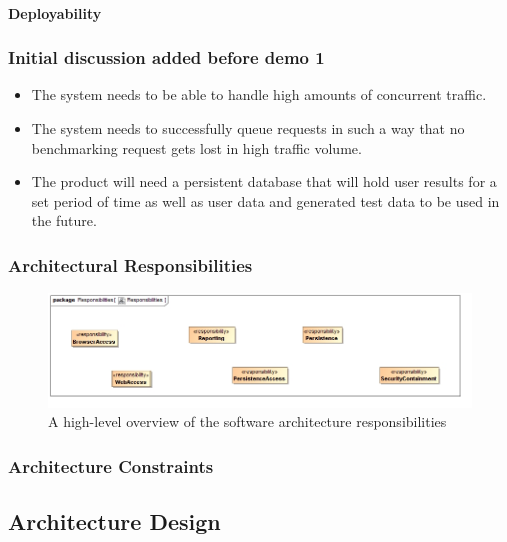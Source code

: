 \paragraph{Deployability}
\label{sec:systemDeployability}


\subsubsection{Initial discussion added before demo 1}
\begin{itemize}
 \item The system needs to be able to handle high amounts of concurrent traffic.
 \item The system needs to successfully queue requests in such a way that no
	   benchmarking request gets lost in high traffic volume.
 \item The product will need a persistent database that will hold user results
       for a set period of time as well as user data and generated test data to
       be used in the future. 
\end{itemize}


\subsubsection{Architectural Responsibilities}
\begin{figure}[H]
	\begin{center}
	\includegraphics[scale=0.4]{../Diagrams and Charts/Architecture/Responsibilities.jpg}
	\caption{A high-level overview of the software architecture responsibilities}
	\end{center}
	\label{ref:architectureResponsibilities}
\end{figure}

\subsubsection{Architecture Constraints}

\subsection{Architecture Design}
